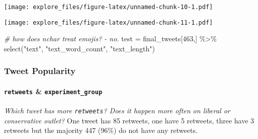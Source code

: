 \documentclass[
]{article}
\newenvironment{Shaded}{\begin{snugshade}}{\end{snugshade}}
\newcommand{\AttributeTok}[1]{\textcolor[rgb]{0.77,0.63,0.00}{#1}}
\newcommand{\CommentTok}[1]{\textcolor[rgb]{0.56,0.35,0.01}{\textit{#1}}}
\newcommand{\DecValTok}[1]{\textcolor[rgb]{0.00,0.00,0.81}{#1}}
\newcommand{\FunctionTok}[1]{\textcolor[rgb]{0.00,0.00,0.00}{#1}}
\newcommand{\NormalTok}[1]{#1}
\newcommand{\OtherTok}[1]{\textcolor[rgb]{0.56,0.35,0.01}{#1}}
\newcommand{\SpecialCharTok}[1]{\textcolor[rgb]{0.00,0.00,0.00}{#1}}
\newcommand{\StringTok}[1]{\textcolor[rgb]{0.31,0.60,0.02}{#1}}
\begin{document}
\texttt{[image: explore\_files/figure-latex/unnamed-chunk-10-1.pdf]}

\begin{Shaded}
\end{Shaded}

\texttt{[image: explore\_files/figure-latex/unnamed-chunk-11-1.pdf]}

\begin{Shaded}
\begin{Highlighting}[]
\CommentTok{\# how does nchar treat emojis? {-} no. }
\NormalTok{test }\OtherTok{=}\NormalTok{ final\_tweets[}\DecValTok{463}\NormalTok{,] }\SpecialCharTok{\%\textgreater{}\%} \FunctionTok{select}\NormalTok{(}\StringTok{"text"}\NormalTok{, }\StringTok{"text\_word\_count"}\NormalTok{, }\StringTok{"text\_length"}\NormalTok{)}
\end{Highlighting}
\end{Shaded}

\hypertarget{tweet-popularity}{%
\subsubsection{Tweet Popularity}\label{tweet-popularity}}

\hypertarget{retweets-experiment_group}{%
\paragraph{\texorpdfstring{\texttt{retweets} \&
\texttt{experiment\_group}}{retweets \& experiment\_group}}\label{retweets-experiment_group}}

\emph{Which tweet has more \texttt{retweets}? Does it happen more often
on liberal or conservative outlet?} One tweet has 85 retweets, one have
5 retweets, three have 3 retweets but the majority 447 (96\%) do not
have any retweets.
\end{document}
